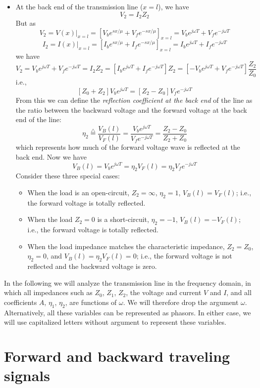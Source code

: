 \begin{itemize}
\item At the back end of the transmission line ($x=l$), we have
  \[	V_2=I_2Z_2	\]
  But as
  \[ V_2=V(x)|_{x=l}=[V_be^{sx/\mu}+V_fe^{-sx/\mu}]_{x=l}
  =V_be^{j\omega T}+V_fe^{-j\omega T}	\]
  \[ I_2=I(x)|_{x=l}=[I_be^{sx/\mu}+I_fe^{-sx/\mu}]_{x=l}
  =I_be^{j\omega T}+I_fe^{-j\omega T}	\]
  we have
  \[ V_2=V_be^{j\omega T}+V_fe^{-j\omega T}=I_2Z_2=[I_be^{j\omega T}+I_fe^{-j\omega T}]Z_2
  =[-V_be^{j\omega T}+V_fe^{-j\omega T}]\frac{Z_2}{Z_0} \]
  i.e.,
  \[ [Z_0+Z_2]V_be^{j\omega T}=[Z_2-Z_0]V_fe^{-j\omega T} \]
  From this we can define the {\em reflection coefficient at the back end}
  of the line as the ratio between the backward voltage and the forward voltage 
  at the back end of the line:
  \[	\eta_2\stackrel{\triangle}{=}\frac{V_B(l)}{V_F(l)}
  =\frac{V_be^{j\omega T}}{V_fe^{-j\omega T}}=\frac{Z_2-Z_0}{Z_2+Z_0}	\]
  which represents how much of the forward voltage wave is reflected at 
  the back end. Now we have
  \[ V_B(l)=V_b e^{j\omega T}=\eta_2 V_F(l)=\eta_2 V_f e^{-j\omega T}  \]
  Consider these three special cases:
  \begin{itemize}
  \item When the load is an open-circuit, $Z_2=\infty$, $\eta_2=1$,
    $V_B(l)=V_F(l)$; i.e., the forward voltage is totally reflected.
  \item When the load $Z_2=0$ is a short-circuit, $\eta_2=-1$, 
    $V_B(l)=-V_F(l)$; i.e., the forward voltage is totally reflected.
  \item When the load impedance matches the characteristic impedance, 
    $Z_2=Z_0$, $\eta_2=0$, and $V_B(l)=\eta_2 V_F(l)=0$; i.e., the forward 
    voltage is not reflected and the backward voltage is zero.
  \end{itemize}

\end{itemize}
In the following we will analyze the transmission line in the frequency
domain, in which all impedances such as $Z_0$, $Z_1$, $Z_2$, the voltage 
and current $V$ and $I$, and all coefficients $A$, $\eta_1$, $\eta_2$, 
are functions of $\omega$. We will therefore drop the argument $\omega$.
Alternatively, all these variables can be represented as phasors. In either
case, we will use capitalized letters without argument to represent these 
variables.


\section*{Forward and backward traveling signals}

